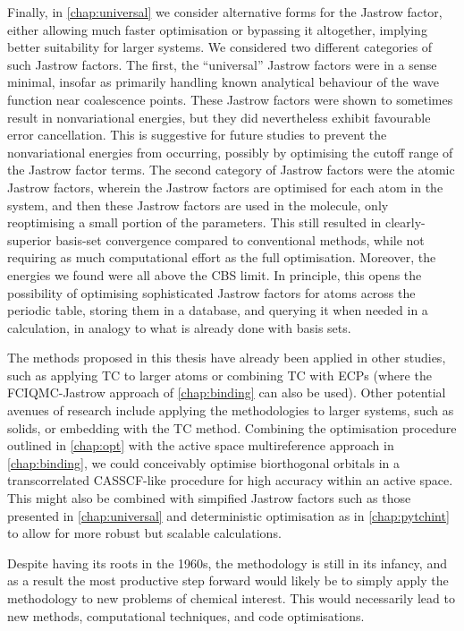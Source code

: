 Finally, in \autoref{chap:universal} we consider alternative forms for the Jastrow factor, either allowing much faster optimisation or bypassing it altogether, implying better suitability for larger systems. We considered two different categories of such Jastrow factors. The first, the ``universal'' Jastrow factors were in a sense minimal, insofar as primarily handling known analytical behaviour of the wave function near coalescence points. These Jastrow factors were shown to sometimes result in nonvariational energies, but they did nevertheless exhibit favourable error cancellation. This is suggestive for future studies to prevent the nonvariational energies from occurring, possibly by optimising the cutoff range of the Jastrow factor terms. The second category of Jastrow factors were the atomic Jastrow factors, wherein the Jastrow factors are optimised for each atom in the system, and then these Jastrow factors are used in the molecule, only reoptimising a small portion of the parameters. This still resulted in clearly-superior basis-set convergence compared to conventional methods, while not requiring as much computational effort as the full optimisation. Moreover, the energies we found were all above the CBS limit. In principle, this opens the possibility of optimising sophisticated Jastrow factors for atoms across the periodic table, storing them in a database, and querying it when needed in a calculation, in analogy to what is already done with basis sets.

The methods proposed in this thesis have already been applied in other studies, such as applying TC to larger atoms\supercite{filip_2ndrow} or combining TC with \glspl{ECP} (where the FCIQMC-Jastrow approach of \autoref{chap:binding} can also be used).\supercite{simulaEcp} Other potential avenues of research include applying the methodologies to larger systems, such as solids, or embedding with the TC method. Combining the optimisation procedure outlined in \autoref{chap:opt} with the active space multireference approach in \autoref{chap:binding}, we could conceivably optimise biorthogonal orbitals in a transcorrelated CASSCF-like procedure for high accuracy within an active space. This might also be combined with simpified Jastrow factors such as those presented in \autoref{chap:universal} and deterministic optimisation as in \autoref{chap:pytchint} to allow for more robust but scalable calculations.

Despite having its roots in the 1960s, the methodology is still in its infancy, and as a result the most productive step forward would likely be to simply apply the methodology to new problems of chemical interest. This would necessarily lead to new methods, computational techniques, and code optimisations.

